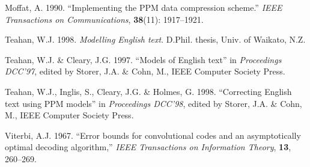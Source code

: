 \documentclass[11pt]{article}
\begin{document}
{\begin{list}{}{\setlength{\parsep}{0.1 cm} \setlength{\rightmargin}{0 cm}
\setlength{\leftmargin}{0 cm}}
\item []
Moffat, A. 1990.
``Implementing the PPM data compression scheme.''
{\em IEEE Transactions on Communications}, {\bf 38}(11): 1917--1921.

\item []
Teahan, W.J. 1998. {\em Modelling English text}. D.Phil. thesis,
Univ. of Waikato, N.Z.

\item []
Teahan, W.J. \& Cleary, J.G. 1997.
``Models of English text'' in
{\em Proceedings DCC'97}, edited by Storer, J.A. \& Cohn, M.,
IEEE Computer Society Press.

\item []
Teahan, W.J., Inglis, S., Cleary, J.G. \& Holmes, G. 1998.
``Correcting English text using PPM models'' in
{\em Proceedings DCC'98}, edited by Storer, J.A. \& Cohn, M.,
IEEE Computer Society Press.

\item []
Viterbi, A.J. 1967. ``Error bounds for convolutional codes and an
asymptotically optimal decoding algorithm,'' {\em IEEE Transactions on
Information Theory}, {\bf 13}, 260--269.

\end{list}
}

\baselineskip 9pt
\end{document}
